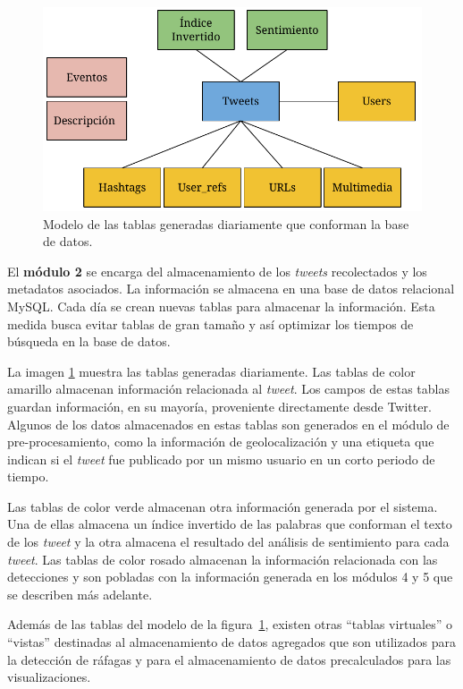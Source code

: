 \begin{figure}[ht]
	\centering
	\includegraphics[width=0.8\linewidth]{imagenes/tweetmodel.pdf}
	\caption{Modelo de las tablas generadas diariamente que conforman la base de datos.}
	\label{img:database}
\end{figure}

El \textbf{módulo 2} se encarga del almacenamiento de los \textit{tweets} recolectados y los metadatos asociados. La información se almacena en una base de datos relacional MySQL. 
%
Cada día se crean nuevas tablas para almacenar la información. Esta medida busca evitar tablas de gran tamaño y así optimizar los tiempos de búsqueda en la base de datos. 


La imagen \ref{img:database} muestra las tablas generadas diariamente. 
%
Las tablas de color amarillo almacenan información relacionada al \textit{tweet}. 
%
Los campos de estas tablas guardan información, en su mayoría, proveniente directamente desde Twitter.
%
Algunos de los datos almacenados en estas tablas son generados en el módulo de pre-procesamiento, como la información de geolocalización y una etiqueta que indican si el \textit{tweet} fue publicado por un mismo usuario en un corto periodo de tiempo.

Las tablas de color verde almacenan otra información generada por el sistema.
%
Una de ellas almacena un índice invertido de las palabras que conforman el texto de los \textit{tweet} y la otra almacena el resultado del análisis de sentimiento para cada \textit{tweet}. 
%
Las tablas de color rosado almacenan la información relacionada con las detecciones y son pobladas con la información generada en los módulos 4 y 5 que se describen más adelante. 


Además de las tablas del modelo de la figura~\ref{img:database}, existen otras ``tablas virtuales'' o ``vistas'' destinadas al almacenamiento de datos agregados que son utilizados para la detección de ráfagas y para el almacenamiento de datos precalculados para las visualizaciones.
%


